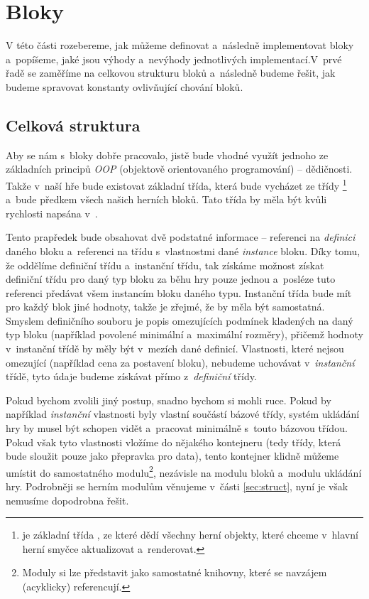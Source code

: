 
\section{Bloky}

V této části rozebereme, jak můžeme definovat a~následně implementovat bloky a~popíšeme, jaké jsou výhody a~nevýhody jednotlivých implementací.\linebreak V~prvé řadě se zaměříme na celkovou strukturu bloků a~následně budeme řešit, jak budeme spravovat konstanty ovlivňující chování bloků.

\subsection{Celková struktura}

Aby se nám s~bloky dobře pracovalo, jistě bude vhodné využít jednoho ze základních principů \textit{OOP} (objektově orientovaného programování) -- dědičnosti. Takže v~naší hře bude existovat základní třída, která bude vycházet ze třídy \footnote{ je základní třída \UEu{}, ze které dědí všechny herní objekty, které chceme v~hlavní herní smyčce aktualizovat a~renderovat.} a~bude předkem všech našich herních bloků. Tato třída by měla být kvůli rychlosti napsána v~\CPP{}.

Tento prapředek bude obsahovat dvě podstatné informace -- referenci na \textit{definici} daného bloku a~referenci na třídu s~vlastnostmi dané \textit{instance} bloku. Díky tomu, že oddělíme definiční třídu a~instanční třídu, tak získáme možnost získat definiční třídu pro daný typ bloku za běhu hry pouze jednou a~posléze tuto referenci předávat všem instancím bloku daného typu. Instanční třída bude mít pro každý blok jiné hodnoty, takže je zřejmé, že by měla být samostatná. Smyslem definičního souboru je popis omezujících podmínek kladených na daný typ bloku (například povolené minimální a~maximální rozměry), přičemž hodnoty v~instanční třídě by měly být v~mezích dané definicí. Vlastnosti, které nejsou omezující (například cena za postavení bloku), nebudeme uchovávat v~\textit{instanční} třídě, tyto údaje budeme získávat přímo z~\textit{definiční} třídy.

Pokud bychom zvolili jiný postup, snadno bychom si mohli  ruce. Pokud by například \textit{instanční} vlastnosti byly vlastní součástí bázové třídy, systém ukládání hry by musel být schopen vidět a~pracovat minimálně s~touto bázovou třídou. Pokud však tyto vlastnosti vložíme do nějakého kontejneru (tedy třídy, která bude sloužit pouze jako přepravka pro data), tento kontejner klidně můžeme umístit do samostatného modulu\footnote{Moduly si lze představit jako samostatné knihovny, které se navzájem (acyklicky) referencují.}, nezávisle na modulu bloků a~modulu ukládání hry.  Podrobněji se herním modulům věnujeme v~části \ref{sec:struct}, nyní je však nemusíme dopodrobna řešit.

